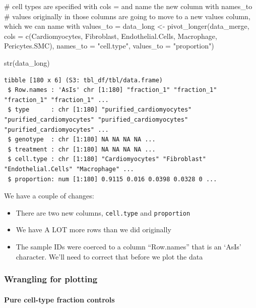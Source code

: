 \documentclass[
  letterpaper,
  DIV=11,
  numbers=noendperiod]{scrreprt}
\let\oldparagraph\paragraph
\renewcommand{\paragraph}[1]{\oldparagraph{#1}\mbox{}}
\newenvironment{Shaded}{\begin{snugshade}}{\end{snugshade}}
\newcommand{\AttributeTok}[1]{\textcolor[rgb]{0.40,0.45,0.13}{#1}}
\newcommand{\CommentTok}[1]{\textcolor[rgb]{0.37,0.37,0.37}{#1}}
\newcommand{\FunctionTok}[1]{\textcolor[rgb]{0.28,0.35,0.67}{#1}}
\newcommand{\NormalTok}[1]{\textcolor[rgb]{0.00,0.23,0.31}{#1}}
\newcommand{\OtherTok}[1]{\textcolor[rgb]{0.00,0.23,0.31}{#1}}
\newcommand{\StringTok}[1]{\textcolor[rgb]{0.13,0.47,0.30}{#1}}
\begin{document}
\begin{Shaded}
\begin{Highlighting}[]
\CommentTok{\# cell types are specified with cols = and name the new column with names\_to}
\CommentTok{\# values originally in those columns are going to move to a new values column, which we can name with values\_to =}
\NormalTok{data\_long }\OtherTok{\textless{}{-}} \FunctionTok{pivot\_longer}\NormalTok{(data\_merge, }
                          \AttributeTok{cols =} \FunctionTok{c}\NormalTok{(Cardiomyocytes, Fibroblast, Endothelial.Cells, Macrophage, Pericytes.SMC), }
                          \AttributeTok{names\_to =} \StringTok{"cell.type"}\NormalTok{, }\AttributeTok{values\_to =} \StringTok{"proportion"}\NormalTok{)}

\FunctionTok{str}\NormalTok{(data\_long)}
\end{Highlighting}
\end{Shaded}

\begin{verbatim}
tibble [180 x 6] (S3: tbl_df/tbl/data.frame)
 $ Row.names : 'AsIs' chr [1:180] "fraction_1" "fraction_1" "fraction_1" "fraction_1" ...
 $ type      : chr [1:180] "purified_cardiomyocytes" "purified_cardiomyocytes" "purified_cardiomyocytes" "purified_cardiomyocytes" ...
 $ genotype  : chr [1:180] NA NA NA NA ...
 $ treatment : chr [1:180] NA NA NA NA ...
 $ cell.type : chr [1:180] "Cardiomyocytes" "Fibroblast" "Endothelial.Cells" "Macrophage" ...
 $ proportion: num [1:180] 0.9115 0.016 0.0398 0.0328 0 ...
\end{verbatim}

We have a couple of changes:

\begin{itemize}
\item
  There are two new columns, \texttt{cell.type} and \texttt{proportion}
\item
  We have A LOT more rows than we did originally
\item
  The sample IDs were coerced to a column ``Row.names'' that is an
  `AsIs' character. We'll need to correct that before we plot the data
\end{itemize}

\subsubsection{Wrangling for plotting}\label{wrangling-for-plotting}

\paragraph{Pure cell-type fraction
controls}\label{pure-cell-type-fraction-controls}
\end{document}
